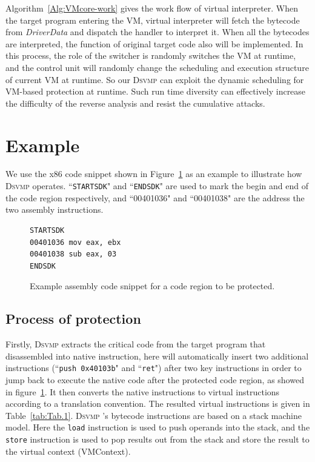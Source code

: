 \documentclass[preprint,12pt,3p]{elsarticle}
\newcommand{\DSVMP}{\textsc{Dsvmp }}
\begin{document}
Algorithm~\ref{Alg:VMcore-work} gives the work flow of virtual interpreter.
When the target program entering the VM, virtual interpreter will fetch the bytecode from \emph{DriverData}
and dispatch the handler to interpret it.
When all the bytecodes are interpreted, the function of original target code also will be implemented.
In this process, the role of the switcher is randomly switches the VM at runtime,
and the control unit will randomly change the scheduling and execution structure of current VM at runtime.
So our \DSVMP can exploit the dynamic scheduling for VM-based protection at runtime.
Such run time diversity can effectively increase the difficulty of the reverse analysis and resist the cumulative attacks.


\section{Example}\label{sec:case}
We use the x86 code snippet shown in Figure~\ref{fig:examplecode} as an example to illustrate how \DSVMP operates.
``\texttt{STARTSDK}" and ``\texttt{ENDSDK}" are used to mark the begin and end of the code region respectively,
and ``00401036" and ``00401038" are the address the two assembly instructions.

\begin{figure}[t!]
\scriptsize
\begin{lstlisting}
STARTSDK
00401036 mov eax, ebx
00401038 sub eax, 03
ENDSDK
\end{lstlisting}
\caption{Example assembly code snippet for a code region to be protected.}
\label{fig:examplecode}
\end{figure}

\subsection{Process of protection}
Firstly, \DSVMP extracts the critical code from the target program that disassembled into native instruction, here will automatically insert two additional instructions (``\texttt{push 0x40103b}" and ``\texttt{ret}") after two key
instructions in order to jump back to execute the native code
after the protected code region, as showed in figure~\ref{fig:examplecode}.
It then converts the native instructions to virtual instructions according to a translation convention.
The resulted virtual instructions is given in Table~\ref{tab:Tab.1}.
\DSVMP's bytecode instructions are based on a stack machine model.
Here the \texttt{load} instruction is used to push operands into the stack,
and the \texttt{store} instruction is used to pop results out from the stack
and store the result to the virtual context (VMContext).
\end{document}
